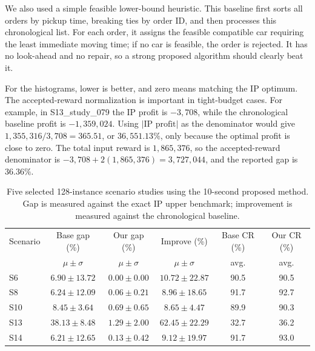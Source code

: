 \documentclass[10pt,a4paper]{article}
\begin{document}
We also used a simple feasible lower-bound heuristic.  This baseline first sorts
all orders by pickup time, breaking ties by order ID, and then processes this
chronological list.  For each order, it assigns the feasible compatible car
requiring the least immediate moving time; if no car is feasible, the order is
rejected.  It has no look-ahead and no repair, so a strong proposed algorithm
should clearly beat it.

For the histograms, lower is better, and zero means matching the IP optimum.
The accepted-reward normalization is important in tight-budget cases.  For
example, in S13\_study\_079 the IP profit is $-3{,}708$, while the chronological
baseline profit is $-1{,}359{,}024$.
Using $|\text{IP profit}|$ as the denominator would give
$1{,}355{,}316/3{,}708=365.51$, or $36{,}551.13\%$, only because the optimal
profit is close to zero.  The total input reward is $1{,}865{,}376$, so the
accepted-reward denominator is $-3{,}708+2(1{,}865{,}376)=3{,}727{,}044$, and
the reported gap is $36.36\%$.

\begin{table}[ht]
\centering
\small
\setlength{\tabcolsep}{3pt}
\begin{tabular}{lccc|cc}
\toprule
Scenario & Base gap (\%) & Our gap (\%) & Improve (\%) & Base CR (\%) & Our CR (\%)\\
& $\mu \pm \sigma$ & $\mu \pm \sigma$ & $\mu \pm \sigma$ & avg. & avg.\\
\midrule
S6  & $6.90 \pm 13.72$ & $0.00 \pm 0.00$ & $10.72 \pm 22.87$ & 90.5 & 90.5\\
S8  & $6.24 \pm 12.09$ & $0.06 \pm 0.21$ & $8.96 \pm 18.65$ & 91.7 & 92.7\\
S10 & $8.45 \pm 3.64$ & $0.69 \pm 0.65$ & $8.65 \pm 4.47$ & 89.9 & 90.3\\
S13 & $38.13 \pm 8.48$ & $1.29 \pm 2.00$ & $62.45 \pm 22.29$ & 32.7 & 36.2\\
S14 & $6.21 \pm 12.65$ & $0.13 \pm 0.42$ & $9.12 \pm 19.97$ & 91.7 & 93.0\\
\bottomrule
\end{tabular}
\caption{Five selected 128-instance scenario studies using the 10-second
proposed method.  Gap is measured against the exact IP upper benchmark;
improvement is measured against the chronological baseline.}
\end{table}
\end{document}

